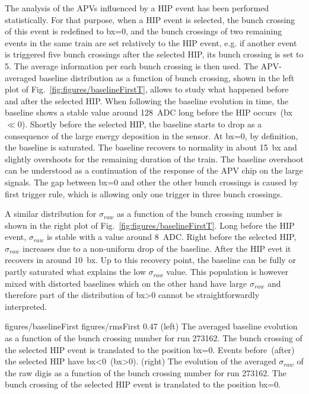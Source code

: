 The analysis of the APVs influenced by a HIP event has been performed statistically. For that purpose, when a HIP event is selected, the bunch crossing of this event is redefined to bx=0, and the bunch crossings of two remaining events in the same train are set relatively to the HIP event, e.g. if another event is triggered five bunch crossings after the selected HIP, its bunch crossing is set to 5. The average information per each bunch crossing is then used. The APV-averaged baseline distribution as a function of bunch crossing, shown in the left plot of Fig.~\ref{fig:figures/baselineFirstT}, allows to study what happened before and after the selected HIP. When following the baseline evolution in time, the baseline shows a stable value around 128~ADC long before the HIP occurs~(bx$\ll$0). Shortly before the selected HIP, the baseline starts to drop as a consequence of the large energy deposition in the sensor. At bx=0, by definition, the baseline is saturated. The baseline recovers to normality in about 15~bx and slightly overshoots for the remaining duration of the train. The baseline overshoot can be understood as a continuation of the response of the APV chip on the large signals. The gap between bx=0 and other the other bunch crossings is caused by first trigger rule, which is allowing only one trigger in three bunch crossings. 

A similar distribution for $\sigma_{raw}$  as a function of the bunch crossing number is shown in the right plot of Fig.~\ref{fig:figures/baselineFirstT}. Long before the HIP event, $\sigma_{raw}$ is stable with a value around 8~ADC. Right before the selected HIP, $\sigma_{raw}$ increases due to a non-uniform drop of the baseline. After the HIP evet it recovers in around 10~bx. Up to this recovery point, the baseline can be fully or partly saturated what explains the low $\sigma_{raw}$ value. This population is however mixed with distorted baselines which on the other hand have large $\sigma_{raw}$ and therefore part of the distribution of bx>0 cannot be straightforwardly interpreted.

                 {figures/baselineFirst} %
                 {figures/rmsFirst} %
                 {0.47}       %
                 {(left) The averaged baseline evolution as a function of the bunch crossing number for run 273162. The bunch crossing of the selected HIP event is translated to the position bx=0. Events before~(after) the selected HIP have bx<0~(bx>0). (right) The evolution of the averaged $\sigma_{raw}$ of the raw digis as a function of the bunch crossing number for run 273162. The bunch crossing of the selected HIP event is translated to the position bx=0. } %

